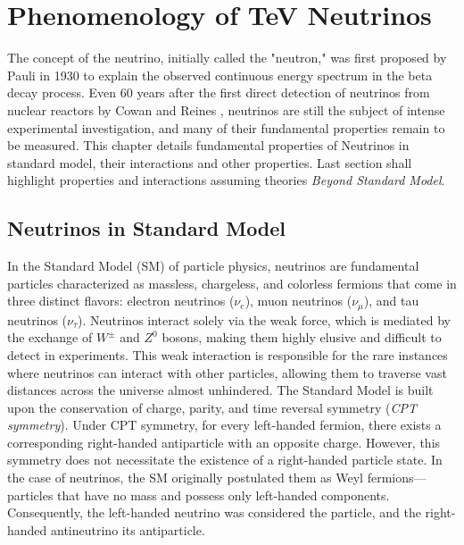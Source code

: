 \setchapterpreamble[u]{\margintoc}
\chapter{Phenomenology of TeV Neutrinos}

The concept of the neutrino, initially called the "neutron," was first proposed by Pauli in 1930  to explain the observed continuous energy spectrum in the beta decay process. Even 60 years after the first direct detection of neutrinos from nuclear reactors by Cowan and Reines , neutrinos are still the subject of intense experimental investigation, and many of their fundamental properties remain to be measured. This chapter details fundamental properties of Neutrinos in standard model, their interactions and other properties. Last section shall highlight properties and interactions assuming theories \emph{Beyond Standard Model}.

\section{Neutrinos in Standard Model}
\label{sec:sm_nu}
In the Standard Model (SM) of particle physics, neutrinos are fundamental particles characterized as massless, chargeless, and colorless fermions that come in three distinct flavors: electron neutrinos ($\nu_e$), muon neutrinos ($\nu_\mu$), and tau neutrinos ($\nu_\tau$). Neutrinos interact solely via the weak force, which is mediated by the exchange of $W^\pm$ and $Z^0$ bosons, making them highly elusive and difficult to detect in experiments. This weak interaction is responsible for the rare instances where neutrinos can interact with other particles, allowing them to traverse vast distances across the universe almost unhindered. The Standard Model is built upon the conservation of charge, parity, and time reversal symmetry (\emph{CPT symmetry}). Under CPT symmetry, for every left-handed fermion, there exists a corresponding right-handed antiparticle with an opposite charge. However, this symmetry does not necessitate the existence of a right-handed particle state. In the case of neutrinos, the SM originally postulated them as Weyl fermions—particles that have no mass and possess only left-handed components. Consequently, the left-handed neutrino was considered the particle, and the right-handed antineutrino its antiparticle. 


